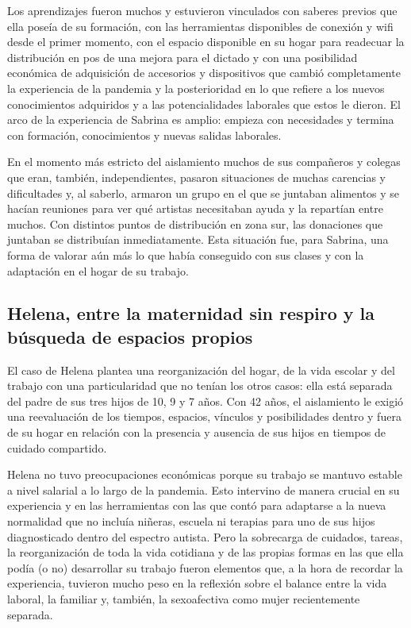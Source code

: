 \begin{refsection}
Los aprendizajes fueron muchos y estuvieron vinculados con saberes previos que ella poseía de su formación, con las herramientas disponibles de conexión y wifi desde el primer momento, con el espacio disponible en su hogar para readecuar la distribución en pos de una mejora para el dictado y con una posibilidad económica de adquisición de accesorios y dispositivos que cambió completamente la experiencia de la pandemia y la posterioridad en lo que refiere a los nuevos conocimientos adquiridos y a las potencialidades laborales que estos le dieron. El arco de la experiencia de Sabrina es amplio: empieza con necesidades y termina con formación, conocimientos y nuevas salidas laborales.

En el momento más estricto del aislamiento muchos de sus compañeros y colegas que eran, también, independientes, pasaron situaciones de muchas carencias y dificultades y, al saberlo, armaron un grupo en el que se juntaban alimentos y se hacían reuniones para ver qué artistas necesitaban ayuda y la repartían entre muchos. Con distintos puntos de distribución en zona sur, las donaciones que juntaban se distribuían inmediatamente. Esta situación fue, para Sabrina, una forma de valorar aún más lo que había conseguido con sus clases y con la adaptación en el hogar de su trabajo.


\subsection[Helena, entre la maternidad sin respiro y la búsqueda de espacios propios]{Helena, entre la maternidad sin respiro y la búsqueda de espacios propios}
\label{cap-28.helena-entre-la-maternidad-sin-respiro-y-la-busqueda-de-espacios-propios}
El caso de Helena plantea una reorganización del hogar, de la vida escolar y del trabajo con una particularidad que no tenían los otros casos: ella está separada del padre de sus tres hijos de 10, 9 y 7 años. Con 42 años, el aislamiento le exigió una reevaluación de los tiempos, espacios, vínculos y posibilidades dentro y fuera de su hogar en relación con la presencia y ausencia de sus hijos en tiempos de cuidado compartido.

Helena no tuvo preocupaciones económicas porque su trabajo se mantuvo estable a nivel salarial a lo largo de la pandemia. Esto intervino de manera crucial en su experiencia y en las herramientas con las que contó para adaptarse a la nueva normalidad que no incluía niñeras, escuela ni terapias para uno de sus hijos diagnosticado dentro del espectro autista. Pero la sobrecarga de cuidados, tareas, la reorganización de toda la vida cotidiana y de las propias formas en las que ella podía (o no) desarrollar su trabajo fueron elementos que, a la hora de recordar la experiencia, tuvieron mucho peso en la reflexión sobre el balance entre la vida laboral, la familiar y, también, la sexoafectiva como mujer recientemente separada.


\end{refsection}

